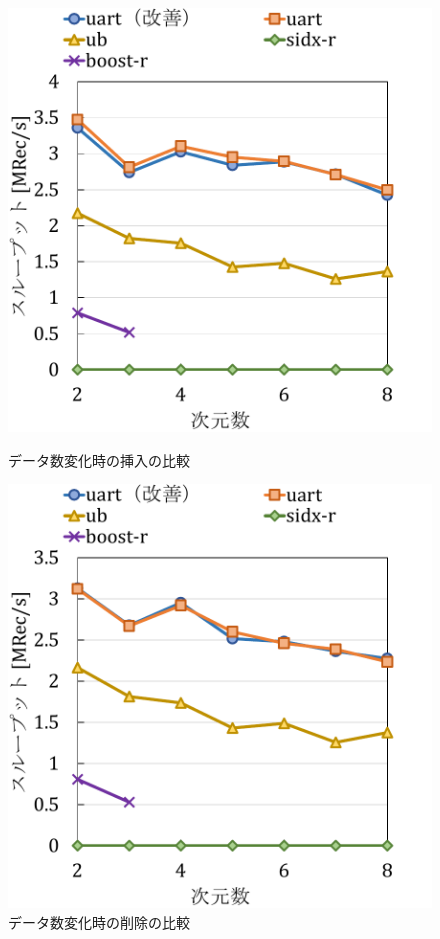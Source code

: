 \begin{figure}[tb]
  \begin{minipage}[c]{0.495\textwidth}
    \centering
    \includegraphics[scale=0.5]{./figures/graph-dimention-delete-0.pdf}
    \caption{データ数変化時の挿入の比較}
    \label{graph:grouped}
  \end{minipage}
  \begin{minipage}[c]{0.495\textwidth}
    \centering
    \includegraphics[scale=0.5]{./figures/graph-dimention-delete-0.5.pdf}
    \caption{データ数変化時の削除の比較}
    \label{graph:paired}
  \end{minipage}
\end{figure}

